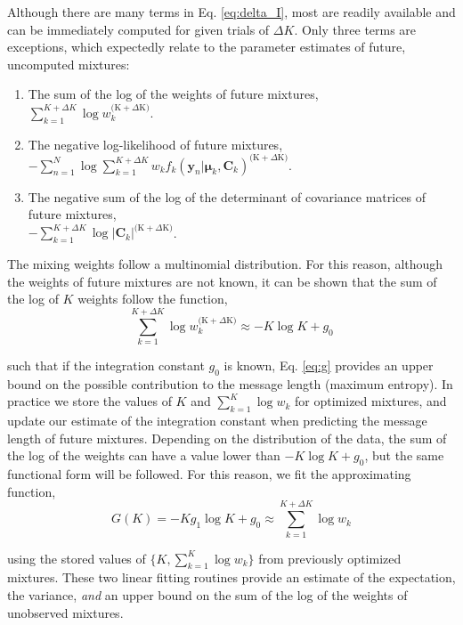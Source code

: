 \documentclass{article}
\newcommand{\vect}[1]{\boldsymbol{\mathbf{#1}}}
\def\veccov{\vect{C}}
\def\vecmean{\vect{\mu}}
\def\weight{w}
\def\datum{y}
\def\data{\vect{\datum}}
\def\future{^{\mathrm{(K} + \Delta\mathrm{K)}}}
\begin{document}
Although there are many terms in Eq. \ref{eq:delta_I}, most are readily
available and can be immediately computed for given trials of $\Delta{K}$.  
Only three terms are exceptions, which expectedly relate to the parameter 
estimates of future, uncomputed mixtures:
\begin{enumerate}
  \item The sum of the log of the weights of future mixtures,\\
        $\sum_{k=1}^{K+\Delta{K}}\log\weight_k\future$.
  \item The negative log-likelihood of future mixtures,\\
        $-\sum_{n=1}^{N}\log\sum_{k=1}^{K+\Delta{K}}\weight_{k}f_{k}(\data_n|\vecmean_k,\veccov_k)\future$.
  \item The negative sum of the log of the determinant of covariance matrices
        of future mixtures,\\
        $-\sum_{k=1}^{K + \Delta{K}}\log|\veccov_k|\future$.
\end{enumerate}

The mixing weights follow a multinomial distribution.  For this reason,
although the weights of future mixtures are not known, it can be shown that
the sum of the log of $K$ weights follow the function,
\begin{equation}
  \sum_{k=1}^{K+\Delta{K}}\log\weight_k\future \approx -K\log{K} + g_0
  \label{eq:g}
\end{equation}

\noindent{}such that if the integration constant $g_0$ is known, Eq. \ref{eq:g}
provides an upper bound on the possible contribution to the message length
(maximum entropy).  In practice we store the values of $K$ and 
$\sum_{k=1}^{K}\log\weight_k$ for optimized mixtures, and update our estimate
of the integration constant when predicting the message length of future
mixtures.  Depending on the distribution of the data, the sum of the log of
the weights can have a value lower than $-K\log{K} + g_0$, but the same
functional form will be followed.  For this reason, we fit the approximating
function,
\begin{equation}
G(K) = -Kg_1\log{K} + g_0 \approx \sum_{k=1}^{K+\Delta{K}}\log\weight_k 
\end{equation}

\noindent{}using the stored values of $\{K,\sum_{k=1}^{K}\log\weight_k\}$ from
previously optimized mixtures.  These two linear fitting routines provide an
estimate of the expectation, the variance, \emph{and} an upper bound on the
sum of the log of the weights of unobserved mixtures.
\end{document}
